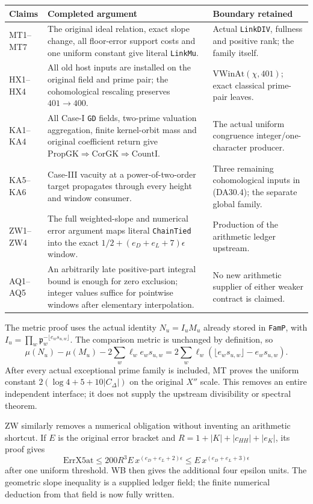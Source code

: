 \begin{center}
\begin{longtable}{p{.12\linewidth}p{.53\linewidth}p{.24\linewidth}}
Claims&Completed argument&Boundary retained\\\hline
MT1--MT7&The original ideal relation, exact slope change, all floor-error
support costs and one uniform constant give literal \texttt{LinkMu}.&
Actual \texttt{LinkDIV}, fullness and positive rank; the family itself.\\
HX1--HX4&All old host inputs are installed on the original field and
prime pair; the cohomological rescaling preserves $401\to400$.&
$\mathrm{VWinAt}(\chi,401)$; exact classical prime-pair leaves.\\
KA1--KA4&All Case-I \texttt{GD} fields, two-prime valuation aggregation,
finite kernel-orbit mass and original coefficient return give
$\mathrm{PropGK}\Rightarrow\mathrm{CorGK}\Rightarrow\mathrm{CountI}$.&
The actual uniform congruence integer/one-character producer.\\
KA5--KA6&Case-III vacuity at a power-of-two-order target propagates through
every height and window consumer.&Three remaining cohomological inputs
in (DA30.4); the separate global family.\\
ZW1--ZW4&The full weighted-slope and numerical error argument maps literal
\texttt{ChainTied} into the exact $1/2+(e_D+e_L+7)\epsilon$ window.&
Production of the arithmetic ledger upstream.\\
AQ1--AQ5&An arbitrarily late positive-part integral bound is enough for
zero exclusion; integer values suffice for pointwise windows after
elementary interpolation.&No new arithmetic supplier of either weaker
contract is claimed.\\
\end{longtable}
\end{center}

The metric proof uses the actual identity $N_u=I_uM_u$ already stored
in \texttt{FamP}, with
$I_u=\prod_w\mathfrak p_w^{-\lfloor e_ws_{u,w}\rfloor}$.
The comparison metric is unchanged by definition, so
\[
 \mu(N_u)-\mu(M_u)
       -2\sum_w\ell_we_ws_{u,w}
      =2\sum_w\ell_w(\lfloor e_ws_{u,w}\rfloor-e_ws_{u,w}).
\]
After every actual exceptional prime family is included, MT proves the
uniform constant $2(\log4+5+10|C_\Delta|)$ on the original $X''$ scale.
This removes an entire independent interface; it does not supply the
upstream divisibility or spectral theorem.

ZW similarly removes a numerical obligation without inventing an
arithmetic shortcut.  If $E$ is the original error bracket and
$R=1+|K|+|c_{HH}|+|e_K|$, its proof gives
\[
 \mathrm{ErrX5at}\le200R^3E\,x^{(e_D+e_L+2)\epsilon}
                  \le E\,x^{(e_D+e_L+3)\epsilon}
\]
after one uniform threshold.  WB then gives the additional four epsilon
units.  The geometric slope inequality is a supplied ledger field;
the finite numerical deduction from that field is now fully written.

